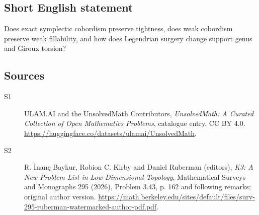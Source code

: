 \documentclass[11pt]{article}
\begin{document}
\subsection{Short English statement}
Does exact symplectic cobordism preserve tightness, does weak cobordism preserve weak fillability, and how does Legendrian surgery change support genus and Giroux torsion?
\subsection{Sources}
\begin{description}
\item[\hypertarget{source:statement:1}{S1}] ULAM.AI and the UnsolvedMath Contributors, \emph{UnsolvedMath: A Curated Collection of Open Mathematics Problems}, catalogue entry. CC BY 4.0. \url{https://huggingface.co/datasets/ulamai/UnsolvedMath}.
\item[\hypertarget{source:statement:2}{S2}] R. İnanç Baykur, Robion C. Kirby and Daniel Ruberman (editors), \emph{K3: A New Problem List in Low-Dimensional Topology}, Mathematical Surveys and Monographs 295 (2026), Problem 3.43, p. 162 and following remarks; original author version. \url{https://math.berkeley.edu/sites/default/files/surv-295-ruberman-watermarked-author-pdf.pdf}.
\end{description}
\label{end:statement}
\end{document}
